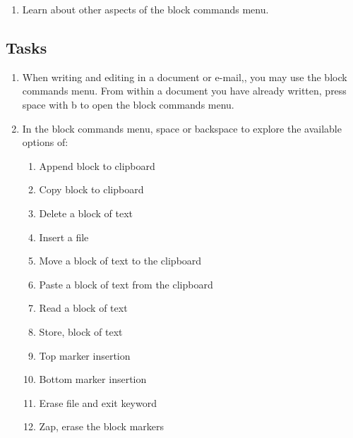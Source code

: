 \documentclass[10pt,letterpaper,twoside]{report}
\begin{document}
{{{{\begin{enumerate}
	\item Learn about other aspects of the block commands menu.
\end{enumerate}



 \subsection{Tasks}



\begin{enumerate}
	\item When writing and editing in a document or e-mail,, you may use the block commands menu.  From within a document you have already written, press space with b to open the block commands menu.
	      
	\item In the block commands menu, space or backspace to explore the available options of:
	      
	      \begin{enumerate}
		      \item Append block to clipboard
		            
		      \item Copy block to clipboard
		            
		      \item Delete a block of text
		            
		      \item Insert a file
		            
		      \item Move a block of text to the clipboard
		            
		      \item Paste a block of text from the clipboard
		            
		      \item Read a block of text
		            
		      \item Store, block of text
		            
		      \item Top marker insertion
		            
		      \item Bottom marker insertion
		            
		      \item Erase file and exit keyword
		            
		      \item Zap, erase the block markers
		            

\end{enumerate}
\end{enumerate}}}}}
\end{document}
